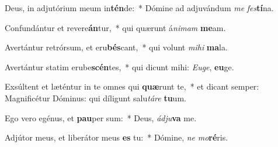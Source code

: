 \item Deus, in adjutórium meum in\textbf{tén}de:~* Dómine ad adjuvándum \textit{me} \textit{fes}\textbf{tí}na.
\item Confundántur et revere\textbf{án}tur,~* qui quærunt á\textit{ni}\textit{mam} \textbf{me}am.
\item Avertántur retrórsum, et eru\textbf{bés}cant,~* qui volunt \textit{mi}\textit{hi} \textbf{ma}la.
\item Avertántur statim erube\textbf{scén}tes,~* qui dicunt mihi: \textit{Eu}\textit{ge}, \textbf{eu}ge.
\item Exsúltent et læténtur in te omnes qui \textbf{quæ}runt te,~* et dicant semper: Magnificétur Dóminus: qui díligunt salu\textit{tá}\textit{re} \textbf{tu}um.
\item Ego vero egénus, et \textbf{pau}per sum:~* Deus, \textit{ád}\textit{ju}\textbf{va} me.
\item Adjútor meus, et liberátor meus \textbf{es} tu:~* Dómine, \textit{ne} \textit{mo}\textbf{ré}ris.
